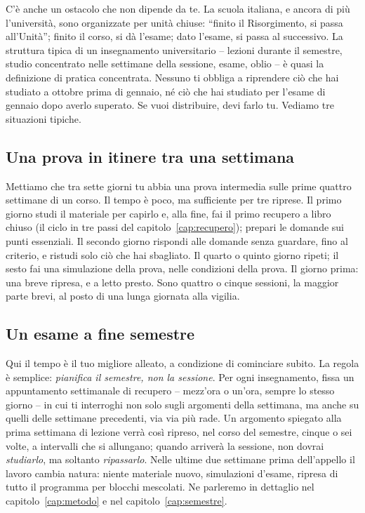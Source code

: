 C'è anche un ostacolo che non dipende da te. La scuola italiana, e
ancora di più l'università, sono organizzate per unità chiuse:
\enquote{finito il Risorgimento, si passa all'Unità}; finito il corso,
si dà l'esame; dato l'esame, si passa al successivo. La struttura
tipica di un insegnamento universitario -- lezioni durante il semestre,
studio concentrato nelle settimane della sessione, esame, oblio -- è
quasi la definizione di pratica concentrata. Nessuno ti obbliga a
riprendere ciò che hai studiato a ottobre prima di gennaio, né ciò che
hai studiato per l'esame di gennaio dopo averlo superato. Se vuoi
distribuire, devi farlo tu. Vediamo tre situazioni tipiche.

\subsection*{Una prova in itinere tra una settimana}

Mettiamo che tra sette giorni tu abbia una prova intermedia sulle
prime quattro settimane di un corso. Il tempo è poco, ma sufficiente
per tre riprese. Il primo giorno studi il materiale per capirlo e, alla
fine, fai il primo recupero a libro chiuso (il ciclo in tre passi del
capitolo~\ref{cap:recupero}); prepari le domande sui punti essenziali.
Il secondo giorno rispondi alle domande senza guardare, fino al
criterio, e ristudi solo ciò che hai sbagliato. Il quarto o quinto
giorno ripeti; il sesto fai una simulazione della prova, nelle
condizioni della prova. Il giorno prima: una breve ripresa, e a letto
presto. Sono quattro o cinque sessioni, la maggior parte brevi, al
posto di una lunga giornata alla vigilia.

\subsection*{Un esame a fine semestre}

Qui il tempo è il tuo migliore alleato, a condizione di cominciare
subito. La regola è semplice: \emph{pianifica il semestre, non la
sessione}. Per ogni insegnamento, fissa un appuntamento settimanale di
recupero -- mezz'ora o un'ora, sempre lo stesso giorno -- in cui ti
interroghi non solo sugli argomenti della settimana, ma anche su quelli
delle settimane precedenti, via via più rade. Un argomento spiegato alla
prima settimana di lezione verrà così ripreso, nel corso del semestre,
cinque o sei volte, a intervalli che si allungano; quando arriverà la
sessione, non dovrai \emph{studiarlo}, ma soltanto \emph{ripassarlo}.
Nelle ultime due settimane prima dell'appello il lavoro cambia
natura: niente materiale nuovo, simulazioni d'esame, ripresa di tutto
il programma per blocchi mescolati. Ne parleremo in dettaglio nel
capitolo~\ref{cap:metodo} e nel capitolo~\ref{cap:semestre}.

